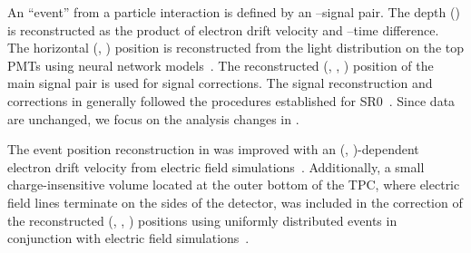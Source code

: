 \documentclass[
    reprint,
    superscriptaddress,
    aps, prl,
    amsmath,amssymb,
    twocolumn,
    showkeys,
    floatfix,
    nofootinbib,
]{revtex4-2}
\begin{document}
An ``event'' from a particle interaction is defined by an \sone--\stwo signal pair.
The depth (\z) is reconstructed as the product of electron drift velocity and \sone--\stwo time difference. The horizontal (\x, \y) position is reconstructed from the \stwo light distribution on the top PMTs using neural network models~\cite{XENON:2024ap1}. 
The reconstructed (\x, \y, \z) position of the main signal pair is used for signal corrections. The signal reconstruction and corrections in \srone generally followed the procedures established for SR0~\cite{XENON:2024ap1}.
Since \srzero data are unchanged, we focus on the analysis changes in \srone.

The event position reconstruction in \srone was improved with an (\radius, \z)-dependent electron drift velocity from electric field simulations~\cite{XENONnT:2023field}. 
Additionally, a small charge-insensitive volume located at the outer bottom of the TPC, where electric field lines terminate on the sides of the detector, was included in the correction of the reconstructed (\x, \y, \z) positions using uniformly distributed  events in conjunction with electric field simulations~\cite{XENONnT:2023field}.
\end{document}
